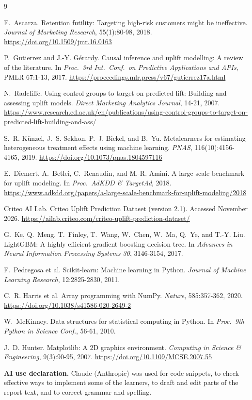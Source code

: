 \begin{thebibliography}{9}
\raggedright

E.~Ascarza. Retention futility: Targeting high-risk customers might be ineffective.
\emph{Journal of Marketing Research}, 55(1):80-98, 2018.
\url{https://doi.org/10.1509/jmr.16.0163}

P.~Gutierrez and J.-Y. G\'erardy. Causal inference and uplift modelling: A review of the literature.
In \emph{Proc.\ 3rd Int.\ Conf.\ on Predictive Applications and APIs}, PMLR 67:1-13, 2017.
\url{https://proceedings.mlr.press/v67/gutierrez17a.html}

N.~Radcliffe. Using control groups to target on predicted lift: Building and assessing uplift models.
\emph{Direct Marketing Analytics Journal}, 14-21, 2007.
\url{https://www.research.ed.ac.uk/en/publications/using-control-groups-to-target-on-predicted-lift-building-and-ass/}

S.~R. K\"unzel, J.~S. Sekhon, P.~J. Bickel, and B.~Yu. Metalearners for estimating heterogeneous
treatment effects using machine learning. \emph{PNAS}, 116(10):4156-4165, 2019.
\url{https://doi.org/10.1073/pnas.1804597116}

E.~Diemert, A.~Betlei, C.~Renaudin, and M.-R. Amini. A large scale benchmark for uplift modeling.
In \emph{Proc.\ AdKDD \& TargetAd}, 2018.
\url{https://www.adkdd.org/papers/a-large-scale-benchmark-for-uplift-modeling/2018}


Criteo AI Lab. Criteo Uplift Prediction Dataset (version 2.1). Accessed November 2026.
\url{https://ailab.criteo.com/criteo-uplift-prediction-dataset/}

G.~Ke, Q.~Meng, T.~Finley, T.~Wang, W.~Chen, W.~Ma, Q.~Ye, and T.-Y. Liu. LightGBM: A highly efficient gradient boosting decision tree.
In \emph{Advances in Neural Information Processing Systems 30}, 3146-3154, 2017.

F.~Pedregosa et al. Scikit-learn: Machine learning in Python. \emph{Journal of Machine Learning Research}, 12:2825-2830, 2011.

C.~R. Harris et al. Array programming with NumPy. \emph{Nature}, 585:357-362, 2020.
\url{https://doi.org/10.1038/s41586-020-2649-2}

W.~McKinney. Data structures for statistical computing in Python. In \emph{Proc.\ 9th Python in Science Conf.}, 56-61, 2010.

J.~D. Hunter. Matplotlib: A 2D graphics environment. \emph{Computing in Science \& Engineering}, 9(3):90-95, 2007.
\url{https://doi.org/10.1109/MCSE.2007.55}

\end{thebibliography}

\par\medskip
{\noindent\textbf{AI use declaration.} Claude (Anthropic) was used for code snippets, to check effective ways to implement some of the learners, to draft and edit parts of the report text, and to correct grammar and spelling.\par}

